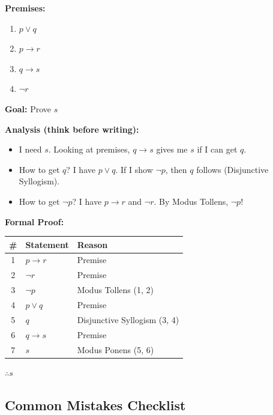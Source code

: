 \documentclass[11pt,a4paper]{article}
\begin{document}
\begin{examplebox}
\textbf{Premises:}
\begin{enumerate}[noitemsep]
    \item $p \lor q$
    \item $p \to r$
    \item $q \to s$
    \item $\neg r$
\end{enumerate}
\textbf{Goal:} Prove $s$

\textbf{Analysis (think before writing):}
\begin{itemize}[noitemsep]
    \item I need $s$. Looking at premises, $q \to s$ gives me $s$ if I can get $q$.
    \item How to get $q$? I have $p \lor q$. If I show $\neg p$, then $q$ follows (Disjunctive Syllogism).
    \item How to get $\neg p$? I have $p \to r$ and $\neg r$. By Modus Tollens, $\neg p$!
\end{itemize}

\textbf{Formal Proof:}
\begin{center}
\begin{tabular}{c|l|l}
\toprule
\# & Statement & Reason \\
\midrule
1 & $p \to r$ & Premise \\
2 & $\neg r$ & Premise \\
3 & $\neg p$ & Modus Tollens (1, 2) \\
4 & $p \lor q$ & Premise \\
5 & $q$ & Disjunctive Syllogism (3, 4) \\
6 & $q \to s$ & Premise \\
7 & $s$ & Modus Ponens (5, 6) \\
\bottomrule
\end{tabular}
\end{center}

$\therefore s$ \checkmark
\end{examplebox}

\subsection{Common Mistakes Checklist}
\end{document}

